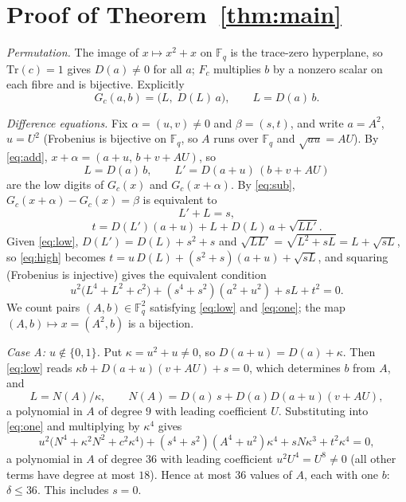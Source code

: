 \documentclass[11pt]{amsart}
\theoremstyle{definition}
\newcommand{\Fq}{\mathbb{F}_q}
\newcommand{\Tr}{\mathrm{Tr}}
\newcommand{\diff}{\delta}
\begin{document}
\section{\texorpdfstring{Proof of Theorem~\ref{thm:main}}{Proof of the main theorem}}\label{sec:proof}

\emph{Permutation.} The image of $x\mapsto x^2+x$ on $\Fq$ is the trace-zero hyperplane, so $\Tr(c)=1$ gives $D(a)\ne0$ for all $a$;
$F_c$ multiplies $b$ by a nonzero scalar on each fibre and is bijective. Explicitly
\[
G_c(a,b)=\bigl(L,\;D(L)\,a\bigr),\qquad L=D(a)\,b .
\]

\emph{Difference equations.} Fix $\alpha=(u,v)\ne0$ and $\beta=(s,t)$, and write $a=A^2$, $u=U^2$ (Frobenius is bijective on $\Fq$,
so $A$ runs over $\Fq$ and $\sqrt{au}=AU$). By \eqref{eq:add}, $x+\alpha=(a+u,\,b+v+AU)$, so
\[
L=D(a)\,b,\qquad L'=D(a+u)\,(b+v+AU)
\]
are the low digits of $G_c(x)$ and $G_c(x+\alpha)$. By \eqref{eq:sub}, $G_c(x+\alpha)-G_c(x)=\beta$ is equivalent to
\begin{equation}\label{eq:low}
L'+L=s,
\end{equation}
\begin{equation}\label{eq:high}
t=D(L')(a+u)+L+D(L)\,a+\sqrt{LL'} .
\end{equation}
Given \eqref{eq:low}, $D(L')=D(L)+s^2+s$ and $\sqrt{LL'}=\sqrt{L^2+sL}=L+\sqrt{sL}$, so \eqref{eq:high} becomes
$t=u\,D(L)+(s^2+s)(a+u)+\sqrt{sL}$, and squaring (Frobenius is injective) gives the equivalent condition
\begin{equation}\label{eq:one}
u^2\bigl(L^4+L^2+c^2\bigr)+(s^4+s^2)(a^2+u^2)+sL+t^2=0 .
\end{equation}
We count pairs $(A,b)\in\Fq^2$ satisfying \eqref{eq:low} and \eqref{eq:one}; the map $(A,b)\mapsto x=(A^2,b)$ is a bijection.

\emph{Case A: $u\notin\{0,1\}$.} Put $\kappa=u^2+u\ne0$, so $D(a+u)=D(a)+\kappa$. Then \eqref{eq:low} reads
$\kappa b+D(a+u)(v+AU)+s=0$, which determines $b$ from $A$, and
\[
L=N(A)/\kappa,\qquad N(A)=D(a)\,s+D(a)D(a+u)(v+AU),
\]
a polynomial in $A$ of degree $9$ with leading coefficient $U$. Substituting into \eqref{eq:one} and multiplying by $\kappa^4$ gives
\[
u^2\bigl(N^4+\kappa^2N^2+c^2\kappa^4\bigr)+(s^4+s^2)(A^4+u^2)\kappa^4+sN\kappa^3+t^2\kappa^4=0,
\]
a polynomial in $A$ of degree $36$ with leading coefficient $u^2U^4=U^8\ne0$ (all other terms have degree at most $18$). Hence at most
$36$ values of $A$, each with one $b$: $\diff\le36$. This includes $s=0$.
\end{document}
